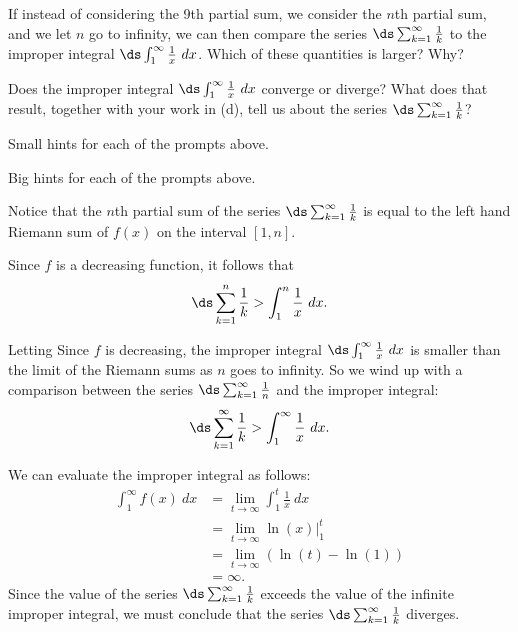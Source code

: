 \begin{activity}
\item If instead of considering the 9th partial sum, we consider the $n$th partial sum, and we let $n$ go to infinity, we can then compare the series $\ds \sum_{k=1}^{\infty} \frac{1}{k}$ to the improper integral $\ds \int_{1}^{\infty} \frac{1}{x} \ dx$.  Which of these quantities is larger?  Why?

\item Does the improper integral $\ds \int_{1}^{\infty} \frac{1}{x} \ dx$ converge or diverge? What does that result, together with your work in (d), tell us about the series $\ds \sum_{k=1}^{\infty} \frac{1}{k}$?

\ea
\end{activity}

\begin{smallhint}
\ba
	\item Small hints for each of the prompts above.
\ea
\end{smallhint}
\begin{bighint}
\ba
	\item Big hints for each of the prompts above.
\ea
\end{bighint}
\begin{activitySolution}
\ba
	\item Notice that the $n$th partial sum of the series $\ds \sum_{k=1}^{\infty} \frac{1}{k}$ is equal to the left hand Riemann sum of $f(x)$ on the interval $[1,n]$.
    \item Since $f$ is a decreasing function, it follows that
\[\ds \sum_{k=1}^{n} \frac{1}{k} > \int_{1}^{n} \frac{1}{x} \ dx.\]
    \item Letting Since $f$ is decreasing, the improper integral $\ds \int_{1}^{\infty} \frac{1}{x} \ dx$ is smaller than the limit of the Riemann sums as $n$ goes to infinity. So  we wind up with a comparison between the series $\ds \sum_{k=1}^{\infty} \frac{1}{n}$ and the improper integral:
\[\ds \sum_{k=1}^{\infty} \frac{1}{k} > \int_{1}^{\infty} \frac{1}{x} \ dx.\]
    \item We can evaluate the improper integral as follows:
\begin{align*}
\int_{1}^{\infty} f(x) \ dx &= \lim_{t \to \infty} \int_{1}^{t} \frac{1}{x} \ dx \\
    &= \lim_{t \to \infty} \ln(x) |_{1}^{t} \\
    &= \lim_{t \to \infty} \left(\ln(t) - \ln(1) \right) \\
    &= \infty.
\end{align*}
Since the value of the series $\ds \sum_{k=1}^{\infty} \frac{1}{k}$ exceeds the value of the infinite improper integral, we must conclude that the series $\ds \sum_{k=1}^{\infty} \frac{1}{k}$ diverges.
\ea
\end{activitySolution}
\aftera 